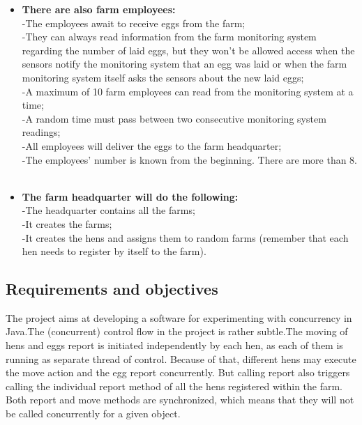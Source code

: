 \documentclass{article}
\begin{document}
\begin{itemize}
\item \textbf{There are also farm employees:}  \\
-The employees await to receive eggs from the farm;\\
-They can always read information from the farm monitoring system regarding the
number of laid eggs, but they won’t be allowed access when the sensors notify the
monitoring system that an egg was laid or when the farm monitoring system itself asks
the sensors about the new laid eggs; \\
-A maximum of 10 farm employees can read from the monitoring system at a time;\\
-A random time must pass between two consecutive monitoring system readings;\\
-All employees will deliver the eggs to the farm headquarter;\\
-The employees’ number is known from the beginning. There are more than 8.\\ \\




\item \textbf{The farm headquarter will do the following:}  \\
-The headquarter contains all the farms;\\
-It creates the farms; \\
-It creates the hens and assigns them to random farms (remember that each hen needs to
register by itself to the farm). \\

\end{itemize}


\subsection{Requirements and objectives}
The project aims at developing a software for experimenting with concurrency in Java.The (concurrent) control flow in the project is rather subtle.The moving of hens
and eggs report is initiated independently by each hen, as each of them is running as separate
thread of control. Because of that, different hens may execute the move action and the egg report concurrently.
But calling report also triggers calling the individual report method of all the hens registered
within the farm. Both report and move methods are synchronized, which means that they will not be called concurrently for a given object.

\newpage
\end{document}
